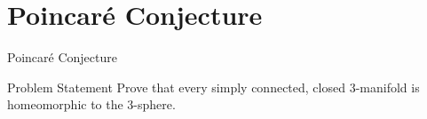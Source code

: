 \documentclass[handout]{beamer}
\newcommand{\Poincare}{Poincar\'{e}}
\begin{document}
  \section{\Poincare{} Conjecture}
  \begin{frame}{\Poincare{} Conjecture}
      \begin{block}{Problem Statement}
          Prove that every simply connected, closed 3-manifold is
          homeomorphic to the 3-sphere.
      \end{block}
  \end{frame}
\end{document}

